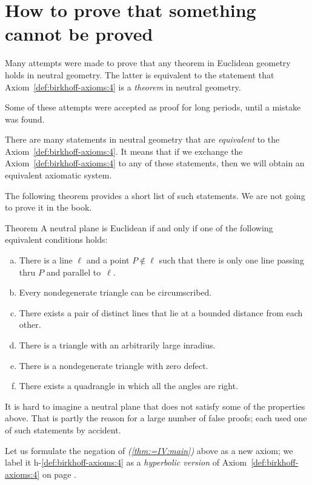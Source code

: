 \section*{How to prove that something\\ 
cannot be proved}

Many attempts were made to prove that any theorem in Euclidean geometry holds in neutral geometry.
The latter is equivalent to the statement that Axiom~\ref{def:birkhoff-axioms:4} is a {}\emph{theorem} in neutral geometry.

Some of these attempts were accepted as proof for long periods, until a mistake was found.

There are many statements in neutral geometry that are {}\emph{equivalent} to the Axiom~\ref{def:birkhoff-axioms:4}.
It means that if we exchange the Axiom~\ref{def:birkhoff-axioms:4}  to any of these statements, then we will obtain an equivalent axiomatic system.

The following theorem provides a short list of such statements.
We are not going to prove it in the book.

\begin{thm}{Theorem}\label{thm:=IV}
A neutral plane is Euclidean if and only if one of the following equivalent conditions holds:
\begin{enumerate}[(a)]
\item\label{thm:=IV:main} 
There is a line $\ell$ 
and a point $P\notin\ell$ 
such that there is only one line passing thru $P$ 
and parallel to~$\ell$.
\item 
Every nondegenerate triangle can be circumscribed.
\item
There exists a pair of distinct lines that lie at a bounded distance from each other.
\item
There is a triangle with an arbitrarily large inradius.
\item
There is a nondegenerate triangle with zero defect.
\item
There exists a quadrangle in which all the angles are right.
\end{enumerate}
\end{thm}

It is hard to imagine a neutral plane that does not satisfy some of the properties above.
That is partly the reason for a large number of false proofs;
each used one of such statements by accident.

Let us formulate the negation of \textit{(\ref{thm:=IV:main})} above as a new axiom;
we label it h-$\!$\ref{def:birkhoff-axioms:4} as a {}\emph{hyperbolic version} of Axiom~\ref{def:birkhoff-axioms:4} on page \pageref{def:birkhoff-axioms:4}.


